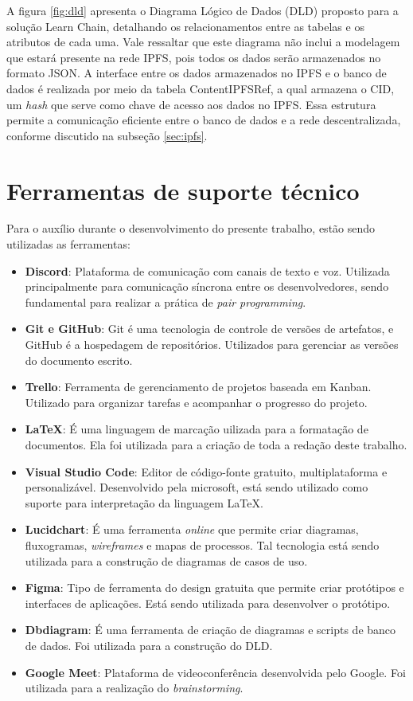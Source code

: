 A figura \ref{fig:dld} apresenta o Diagrama Lógico de Dados (DLD) proposto para a solução Learn Chain, detalhando os relacionamentos entre as tabelas e os atributos de cada uma. Vale ressaltar que este diagrama não inclui a modelagem que estará presente na rede IPFS, pois todos os dados serão armazenados no formato JSON. A interface entre os dados armazenados no IPFS e o banco de dados é realizada por meio da tabela ContentIPFSRef, a qual armazena o CID, um \textit{hash} que serve como chave de acesso aos dados no IPFS. Essa estrutura permite a comunicação eficiente entre o banco de dados e a rede descentralizada, conforme discutido na subseção \ref{sec:ipfs}.

\section{Ferramentas de suporte técnico}
Para o auxílio durante o desenvolvimento do presente trabalho, estão sendo utilizadas as ferramentas:

\begin{itemize}
    \item \textbf{Discord}: Plataforma de comunicação com canais de texto e voz. Utilizada principalmente para comunicação síncrona entre os desenvolvedores, sendo fundamental para realizar a prática de \textit{pair programming}.
    \item \textbf{Git e GitHub}: Git é uma tecnologia de controle de versões de artefatos, e GitHub é a hospedagem de repositórios. Utilizados para gerenciar as versões do documento escrito.
    \item \textbf{Trello}: Ferramenta de gerenciamento de projetos baseada em Kanban. Utilizado para organizar tarefas e acompanhar o progresso do projeto.
    \item \textbf{LaTeX}: É uma linguagem de marcação uilizada para a formatação de documentos. Ela foi utilizada para a criação de toda a redação deste trabalho.
    \item \textbf{Visual Studio Code}: Editor de código-fonte gratuito, multiplataforma e personalizável. Desenvolvido pela microsoft, está sendo utilizado como suporte para interpretação da linguagem LaTeX.
    \item \textbf{Lucidchart}: É uma ferramenta \textit{online} que permite criar diagramas, fluxogramas, \textit{wireframes} e mapas de processos. Tal tecnologia está sendo utilizada para a construção de diagramas de casos de uso.
    \item \textbf{Figma}: Tipo de ferramenta do design gratuita que permite criar protótipos e interfaces de aplicações. Está sendo utilizada para desenvolver o protótipo.
    \item \textbf{Dbdiagram}: É uma ferramenta de criação de diagramas e scripts de banco de dados. Foi utilizada para a construção do DLD.
    \item \textbf{Google Meet}: Plataforma de videoconferência desenvolvida pelo Google. Foi utilizada para a realização do \textit{brainstorming}.
\end{itemize}
